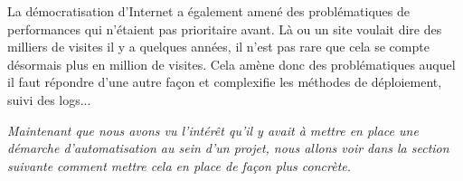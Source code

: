 La démocratisation d'Internet a également amené des problématiques de performances qui n'étaient pas prioritaire avant. Là ou un site  voulait dire des milliers de visites il y a quelques années, il n'est pas rare que cela se compte désormais plus en million de visites. Cela amène donc des problématiques auquel il faut répondre d'une autre façon et complexifie les méthodes de déploiement, suivi des logs...

\hrulefill

\emph{Maintenant que nous avons vu l'intérêt qu'il y avait à mettre en place une démarche d'automatisation au sein d'un projet, nous allons voir dans la section suivante comment mettre cela en place de façon plus concrète.}